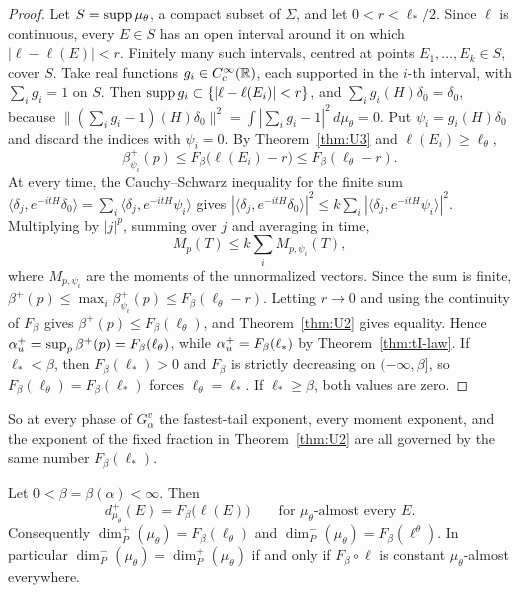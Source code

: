 \begin{proof}
Let $S=\operatorname{supp}\mu_\theta$, a compact subset of $\Sigma$, and let $0<r<\ell_*/2$. Since $\ell$ is continuous, every $E\in S$ has an open interval around it on which $|\ell-\ell(E)|<r$. Finitely many such intervals, centred at points $E_1,\dots,E_k\in S$, cover $S$. Take real functions $g_i\in C_c^\infty(\mathbb R)$, each supported in the $i$-th interval, with $\sum_ig_i=1$ on $S$. Then $\operatorname{supp} g_i\subset\{|\ell-\ell(E_i)|<r\}$, and $\sum_ig_i(H)\delta_0=\delta_0$, because $\|(\sum_ig_i-1)(H)\delta_0\|^2=\int|\sum_ig_i-1|^2\,d\mu_\theta=0$. Put $\psi_i=g_i(H)\delta_0$ and discard the indices with $\psi_i=0$. By Theorem~\ref{thm:U3} and $\ell(E_i)\ge\ell_\theta$,
\[
\beta^+_{\psi_i}(p)\le F_\beta\bigl(\ell(E_i)-r\bigr)\le F_\beta(\ell_\theta-r).
\]
At every time, the Cauchy--Schwarz inequality for the finite sum $\langle\delta_j,e^{-itH}\delta_0\rangle=\sum_i\langle\delta_j,e^{-itH}\psi_i\rangle$ gives $|\langle\delta_j,e^{-itH}\delta_0\rangle|^2\le k\sum_i|\langle\delta_j,e^{-itH}\psi_i\rangle|^2$. Multiplying by $|j|^p$, summing over $j$ and averaging in time,
\[
M_p(T)\le k\sum_iM_{p,\psi_i}(T),
\]
where $M_{p,\psi_i}$ are the moments of the unnormalized vectors. Since the sum is finite, $\beta^+(p)\le\max_i\beta^+_{\psi_i}(p)\le F_\beta(\ell_\theta-r)$. Letting $r\to0$ and using the continuity of $F_\beta$ gives $\beta^+(p)\le F_\beta(\ell_\theta)$, and Theorem~\ref{thm:U2} gives equality. Hence $\alpha_u^+=\sup_p\beta^+(p)=F_\beta(\ell_\theta)$, while $\alpha_u^+=F_\beta(\ell_*)$ by Theorem~\ref{thm:tI-law}. If $\ell_*<\beta$, then $F_\beta(\ell_*)>0$ and $F_\beta$ is strictly decreasing on $(-\infty,\beta]$, so $F_\beta(\ell_\theta)=F_\beta(\ell_*)$ forces $\ell_\theta=\ell_*$. If $\ell_*\ge\beta$, both values are zero.
\end{proof}

So at every phase of $G^v_\alpha$ the fastest-tail exponent, every moment exponent, and the exponent of the fixed fraction in Theorem~\ref{thm:U2} are all governed by the same number $F_\beta(\ell_*)$.

\begin{theorem}\label{thm:localdim}
Let $0<\beta=\beta(\alpha)<\infty$. Then
\[
d^+_{\mu_\theta}(E)=F_\beta\bigl(\ell(E)\bigr)\qquad\text{for }\mu_\theta\text{-almost every }E.
\]
Consequently $\dim_P^+(\mu_\theta)=F_\beta(\ell_\theta)$ and $\dim_P^-(\mu_\theta)=F_\beta(\ell^\theta)$. In particular $\dim_P^-(\mu_\theta)=\dim_P^+(\mu_\theta)$ if and only if $F_\beta\circ\ell$ is constant $\mu_\theta$-almost everywhere.
\end{theorem}

